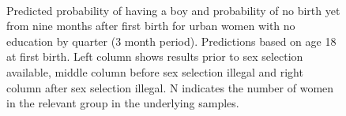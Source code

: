 \documentclass[12pt,letterpaper]{article}
\begin{document}
\begin{figure}[h]
{\begin{minipage}{0.26\textwidth}
        \\
        \captionsetup[subfigure]{labelformat=parens}
    \end{minipage}
}
\setcounter{subfigure}{3}
\caption{Predicted probability of having a boy and probability of
no birth yet from nine months after first birth for urban 
women with no education by quarter (3 month period). 
Predictions based on age 18 at first birth.
Left column shows results prior to sex selection available, middle column before
sex selection illegal and right column after sex selection illegal.
N indicates the number of women in the relevant group in the underlying samples.
}
\label{fig:results_spell2_low_urban}
\end{figure}
\end{document}
